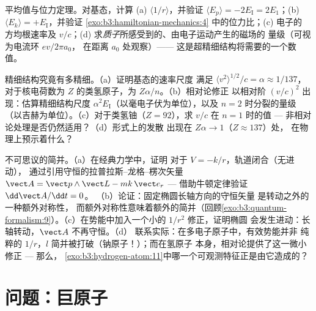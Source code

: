 \begin{exercise}[$\star\star\star$]\label{exo:b3:hydrogen-atom:10}
平均值与位力定理。对基态，计算 (a)
$\langle 1/r\rangle$，并验证 $\langle E_p\rangle = -2E_{\text{I}}
= 2E_1$；(b) $\langle E_k\rangle = +E_{\text{I}}$，并验证
\cref{exo:b3:hamiltonian-mechanics:4} 中的位力比；(c) 电子的
方均根速率及 $v/c$；(d) 求\emph{质子}所感受到的、由电子运动产生的磁场的
量级（可视为电流环 $ev/2\pi a_0$，
在距离 $a_0$ 处观察）——
这是超精细结构将需要的一个数值。
\end{exercise}

\begin{exercise}[$\star\star\star$]\label{exo:b3:hydrogen-atom:11}
精细结构究竟有多精细。（a）证明基态的速率尺度
满足 $\langle v^2\rangle^{1/2}/c = \alpha \approx 1/137$，
对于核电荷数为 $Z$ 的类氢原子，为 $Z\alpha/n$。（b）相对论修正
以相对阶 $(v/c)^2$ 出现：估算精细结构尺度
$\alpha^2E_{\text{I}}$（以毫电子伏为单位），以及
$n = 2$ 时分裂的量级（以吉赫为单位）。（c）对于类氢铀（$Z = 92$），求 $v/c$ 在
$n = 1$ 时的值 --- 非相对论处理是否仍然适用？（d）形式上的发散
出现在 $Z\alpha \to 1$（$Z \approx 137$）处，
在物理上预示着什么？
\end{exercise}

\begin{exercise}[$\star\star\star$]\label{exo:b3:hydrogen-atom:12}
不可思议的简并。（a）在经典力学中，证明
对于 $V = -k/r$，轨道闭合（无进动），
通过引用守恒的拉普拉斯–龙格–楞次矢量 $\vect A = \vect p\wedge\vect
L - mk\,\vect e_r$ --- 借助牛顿定律验证 $\dd\vect A/\dd t = 0$。
（b）论证：固定椭圆长轴方向的守恒矢量
是转动之外的一种额外对称性，
而额外对称性意味着额外的简并（回顾\cref{exo:b3:quantum-formalism:9}）。（c）在势能中加入一个小的
$1/r^2$ 修正，证明椭圆
会发生进动：长轴转动，$\vect A$ 不再守恒。（d）
联系实际：在多电子原子中，有效势能并非
纯粹的 $1/r$，$l$ 简并被打破（钠原子！）；而在氢原子
本身，相对论提供了这一微小修正 --- 那么，
\cref{exo:b3:hydrogen-atom:11}中哪一个可观测特征正是由它造成的？
\end{exercise}

\section{问题：巨原子}

